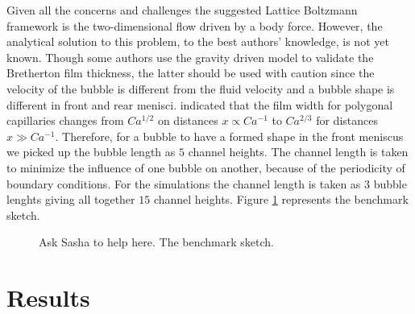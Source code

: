 \documentclass{article}
\begin{document}
Given all the concerns and challenges the suggested Lattice Boltzmann framework
is the two-dimensional flow driven by a body force. However, the analytical
solution to this problem, to the best authors' knowledge, is not yet known.
Though some authors \cite{sehgal-microchannel} use the gravity driven model to
validate the Bretherton film thickness, the latter should be used with caution
since the velocity of the bubble is different from the fluid velocity and a
bubble shape
is different in front and rear menisci. \citet{wong-films} indicated that the
film width for polygonal capillaries
changes from $Ca^{1/2}$ on distances $x\propto Ca^{-1}$ to $Ca^{2/3}$ for
distances $x \gg Ca^{-1}$. Therefore, for a bubble to have a formed shape in
the  front meniscus we picked up the bubble length as $5$ channel heights. The
channel length is taken to minimize the influence of one bubble on another,
because of the periodicity of boundary conditions. For the simulations the
channel length is taken as $3$ bubble lenghts giving all together $15$ channel
heights. Figure \ref{fig:benchmark:sketch} represents the benchmark sketch.
\begin{figure}
\caption{{\color{red} Ask Sasha to help here. The benchmark sketch.}
\label{fig:benchmark:sketch}}
\end{figure}


\section{Results}
\end{document}
